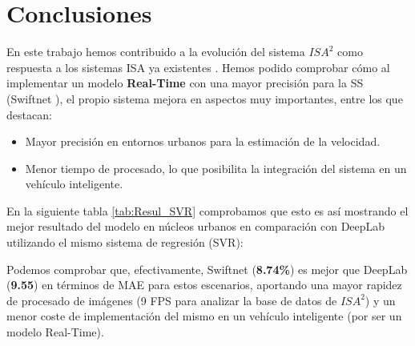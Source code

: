 \chapter{Conclusiones}

En este trabajo hemos contribuido a la evolución del sistema $ISA^{2}$ como respuesta a los sistemas \ac{ISA} ya existentes \cite{isa2}. Hemos podido comprobar cómo al implementar un modelo \textbf{Real-Time} con una mayor precisión para la \ac{SS} (Swiftnet \cite{swiftnet}), el propio sistema mejora en aspectos muy importantes, entre los que destacan:

\begin{itemize}
\item Mayor precisión en entornos urbanos para la estimación de la velocidad.
\item Menor tiempo de procesado, lo que posibilita la integración del sistema en un vehículo inteligente.
\end{itemize}


En la siguiente tabla \ref{tab:Resul_SVR} comprobamos que esto es así mostrando el mejor resultado del modelo en núcleos urbanos en comparación con DeepLab utilizando el mismo sistema de regresión (\ac{SVR}): 

\begin{table}[H]
\centering
{}
\caption{Resultados y \ac{SVR}}
\label{tab:Resul_SVR}
\end{table}

Podemos comprobar que, efectivamente, Swiftnet (\textbf{8.74\%}) es mejor que DeepLab (\textbf{9.55}) en términos de \ac{MAE} para estos escenarios, aportando una mayor rapidez de procesado de imágenes (9 \ac{FPS} para analizar la base de datos de $ISA^{2}$) y un menor coste de implementación del mismo en un vehículo inteligente (por ser un modelo Real-Time). 

